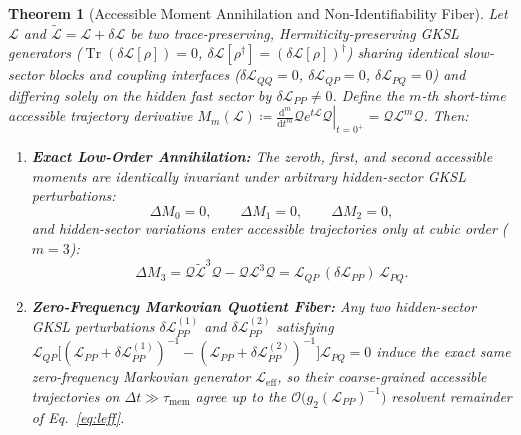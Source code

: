 \documentclass[10pt,letterpaper]{article}
\theoremstyle{plain}
\newtheorem{theorem}{Theorem}
\theoremstyle{definition}
\newcommand{\Lcal}{\mathcal{L}}
\newcommand{\Qcal}{\mathcal{Q}}
\newcommand{\Tr}{\operatorname{Tr}}
\begin{document}
\begin{theorem}[Accessible Moment Annihilation and Non-Identifiability Fiber]
\label{thm:moment}
Let $\Lcal$ and $\widetilde{\Lcal} = \Lcal + \delta\Lcal$ be two trace-preserving, Hermiticity-preserving GKSL generators ($\Tr(\delta\Lcal[\rho]) = 0$, $\delta\Lcal[\rho^\dagger] = (\delta\Lcal[\rho])^\dagger$) sharing identical slow-sector blocks and coupling interfaces ($\delta\Lcal_{QQ} = 0$, $\delta\Lcal_{QP} = 0$, $\delta\Lcal_{PQ} = 0$) and differing solely on the hidden fast sector by $\delta\Lcal_{PP} \neq 0$. Define the $m$-th short-time accessible trajectory derivative $M_m(\Lcal) \coloneqq \left.\frac{\mathrm{d}^m}{\mathrm{d}t^m} \Qcal e^{t\Lcal} \Qcal \right|_{t=0^+} = \Qcal \Lcal^m \Qcal$. Then:
\begin{enumerate}[label=(\roman*),leftmargin=2em,itemsep=2pt]
    \item \textbf{Exact Low-Order Annihilation:} The zeroth, first, and second accessible moments are identically invariant under arbitrary hidden-sector GKSL perturbations:
    \begin{equation}
        \Delta M_0 = 0, \qquad \Delta M_1 = 0, \qquad \Delta M_2 = 0,
    \end{equation}
    and hidden-sector variations enter accessible trajectories only at cubic order ($m=3$):
    \begin{equation}
        \Delta M_3 = \Qcal \widetilde{\Lcal}^3 \Qcal - \Qcal \Lcal^3 \Qcal = \Lcal_{QP}\,(\delta\Lcal_{PP})\,\Lcal_{PQ}.
        \label{eq:cubic_onset}
    \end{equation}
    \item \textbf{Zero-Frequency Markovian Quotient Fiber:} Any two hidden-sector GKSL perturbations $\delta\Lcal_{PP}^{(1)}$ and $\delta\Lcal_{PP}^{(2)}$ satisfying $\Lcal_{QP}\bigl[(\Lcal_{PP} + \delta\Lcal_{PP}^{(1)})^{-1} - (\Lcal_{PP} + \delta\Lcal_{PP}^{(2)})^{-1}\bigr]\Lcal_{PQ} = 0$ induce the exact same zero-frequency Markovian generator $\Lcal_{\mathrm{eff}}$, so their coarse-grained accessible trajectories on $\Delta t \gg \tau_{\mathrm{mem}}$ agree up to the $\mathcal{O}\bigl(g_2(\Lcal_{PP})^{-1}\bigr)$ resolvent remainder of Eq.~\eqref{eq:leff}.
\end{enumerate}
\end{theorem}
\end{document}
